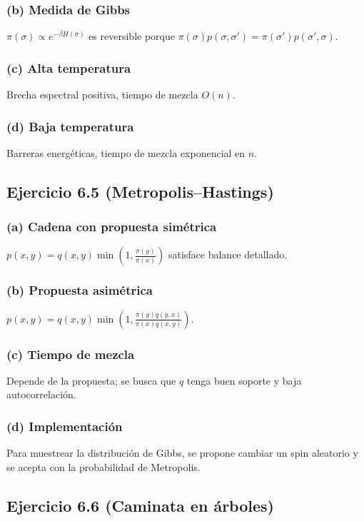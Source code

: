 \documentclass[12pt]{article}
\newcommand{\1}{\mathbf{1}}
\begin{document}
\subsubsection*{(b) Medida de Gibbs}
$\pi(\sigma)\propto e^{-\beta H(\sigma)}$ es reversible porque $\pi(\sigma)p(\sigma,\sigma')=\pi(\sigma')p(\sigma',\sigma)$.

\subsubsection*{(c) Alta temperatura}
Brecha espectral positiva, tiempo de mezcla $O(n)$.

\subsubsection*{(d) Baja temperatura}
Barreras energ\'eticas, tiempo de mezcla exponencial en $n$.

\subsection{Ejercicio 6.5 (Metropolis–Hastings)}

\subsubsection*{(a) Cadena con propuesta sim\'etrica}
$p(x,y)=q(x,y)\min\left(1,\frac{\pi(y)}{\pi(x)}\right)$ satisface balance detallado.

\subsubsection*{(b) Propuesta asim\'etrica}
$p(x,y)=q(x,y)\min\left(1,\frac{\pi(y)q(y,x)}{\pi(x)q(x,y)}\right)$.

\subsubsection*{(c) Tiempo de mezcla}
Depende de la propuesta; se busca que $q$ tenga buen soporte y baja autocorrelaci\'on.

\subsubsection*{(d) Implementaci\'on}
Para muestrear la distribuci\'on de Gibbs, se propone cambiar un spin aleatorio y se acepta con la probabilidad de Metropolis.

\subsection{Ejercicio 6.6 (Caminata en \'arboles)}
\end{document}
